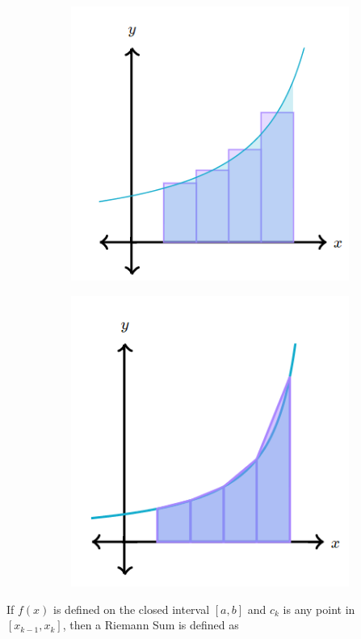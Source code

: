         \begin{figure}[hbt!]
            \centering
            \begin{subfigure}[b]{.45\textwidth}
                \includegraphics[scale=0.8]{Resources/Unit4Integration/Riemann_Mid}
            \end{subfigure}
            \begin{subfigure}[b]{.45\textwidth}
                \includegraphics[scale=0.8]{Resources/Unit4Integration/Riemann_Trapezoid}
            \end{subfigure}
        \end{figure}

        \noindent If $f(x)$ is defined on the closed interval $[a,b]$ and $c_k$ is any point in
        $[x_{k-1}, x_k]$, then a Riemann Sum is defined as

